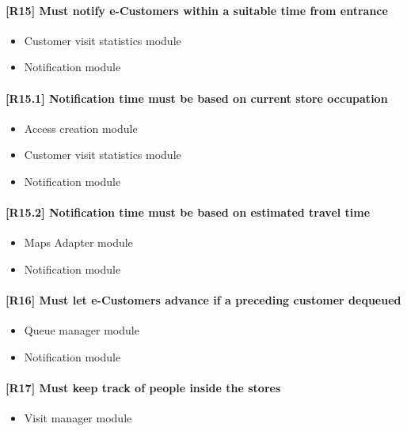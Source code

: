 \paragraph{[R15] Must notify e-Customers within a suitable time from entrance}
\begin{itemize}[itemsep=-1mm, topsep=-1mm]
	\item Customer visit statistics module
	\item Notification module 
\end{itemize}

\paragraph{[R15.1] Notification time must be based on current store occupation}
\begin{itemize}[itemsep=-1mm, topsep=-1mm]
	\item Access creation module
	\item Customer visit statistics module
	\item Notification module
\end{itemize}

\paragraph{[R15.2] Notification time must be based on estimated travel time}
\begin{itemize}[itemsep=-1mm, topsep=-1mm]
	\item Maps Adapter module
	\item Notification module
\end{itemize}

\paragraph{[R16] Must let e-Customers advance if a preceding customer dequeued}
\begin{itemize}[itemsep=-1mm, topsep=-1mm]
	\item Queue manager module
	\item Notification module
\end{itemize}

\paragraph{[R17] Must keep track of people inside the stores}
\begin{itemize}[itemsep=-1mm, topsep=-1mm]
	\item Visit manager module
\end{itemize}

